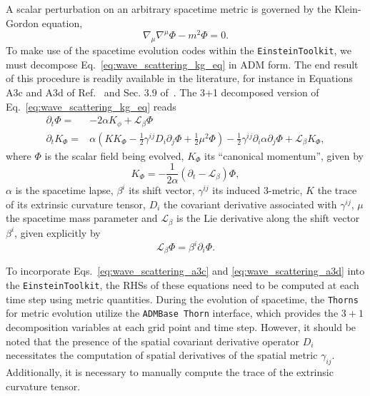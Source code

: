 A scalar perturbation on an arbitrary spacetime metric is governed by the Klein-Gordon equation,
%
\begin{equation}
  \nabla_\mu \nabla^\mu \Phi - m^2 \Phi = 0.
  \label{eq:wave_scattering_kg_eq}
\end{equation}
%
To make use of the spacetime evolution codes within the \texttt{EinsteinToolkit}, we must decompose Eq.~\eqref{eq:wave_scattering_kg_eq} in \ac{ADM} form. The end result of this procedure is readily available in the literature, for instance in Equations A3c and A3d of Ref.~\cite{PhysRevD.96.104040} and Sec. 3.9 of~\cite{Ficarra2023}. The 3+1 decomposed version of Eq.~\eqref{eq:wave_scattering_kg_eq} reads
%
\begin{align}
  \partial_t \Phi =   & -2 \alpha K_\phi + \mathcal{L}_\beta \Phi \label{eq:wave_scattering_a3c}                                                                                                                                                     \\
  \partial_t K_\Phi = & \alpha \left( K K_\Phi - \frac{1}{2} \gamma^{ij} D_i \partial_j \Phi + \frac{1}{2} \mu^2 \Phi \right) - \frac{1}{2} \gamma^{ij} \partial_i \alpha \partial_j \Phi + \mathcal{L}_\beta K_\Phi, \label{eq:wave_scattering_a3d}
\end{align}
%
where $\Phi$ is the scalar field being evolved, $K_\Phi$ its ``canonical momentum'', given by
%
\begin{equation}
  K_\Phi = -\frac{1}{2\alpha} \left( \partial_t - \mathcal{L}_\beta \right)\Phi,
  \label{eq:wave_scattering_a2}
\end{equation}
%
$\alpha$ is the spacetime lapse, $\beta^i$ its shift vector, $\gamma^{ij}$ its induced 3-metric, $K$ the trace of its extrinsic curvature tensor, $D_i$ the covariant derivative associated with $\gamma^{ij}$, $\mu$ the spacetime mass parameter and $\mathcal{L}_\beta$ is the Lie derivative along the shift vector $\beta^i$, given explicitly by
%
\begin{equation}
  \mathcal{L}_\beta\Phi = \beta^i \partial_i \Phi.
  \label{eq:wave_scattering_lie_derivative}
\end{equation}

To incorporate Eqs.~\eqref{eq:wave_scattering_a3c} and \eqref{eq:wave_scattering_a3d} into the \texttt{EinsteinToolkit}, the RHSs of these equations need to be computed at each time step using metric quantities. During the evolution of spacetime, the \texttt{Thorns} for metric evolution utilize the \texttt{ADMBase Thorn} interface, which provides the $3+1$ decomposition variables at each grid point and time step. However, it should be noted that the presence of the spatial covariant derivative operator $D_i$ necessitates the computation of spatial derivatives of the spatial metric $\gamma_{ij}$. Additionally, it is necessary to manually compute the trace of the extrinsic curvature tensor.

